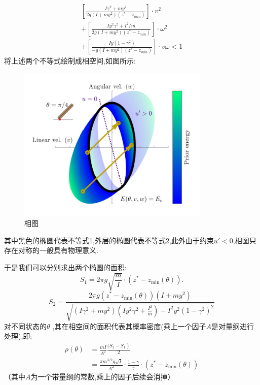 \documentclass[UTF8]{gapd}
\begin{document}
\begin{equation}
\begin{gathered}
\left[ \frac{I\gamma ^2+my^2}{2g\left( I+my^2 \right) \left( z^*-z_{min} \right)} \right] \cdot v^2
\\
+\left[ \frac{Iy^2\gamma ^2+I^2/m}{2g\left( I+my^2 \right) \left( z^*-z_{min} \right)} \right] \cdot \omega ^2
\\
+\left[ \frac{Iy\left( 1-\gamma ^2 \right)}{-g\left( I+my^2 \right) \left( z^*-z_{min} \right)} \right] \cdot v\omega <1
\end{gathered}
\end{equation}
将上述两个不等式绘制成相空间,如图所示:
\begin{figure}[h]%
	\centering
	\includegraphics[width=1\columnwidth]{images/相图}
	\caption{相图\cite{c3}}
	\label{fig:P2}%
\end{figure}
其中黑色的椭圆代表不等式1,外层的椭圆代表不等式2,此外由于约束$u'<0$,相图只存在对称的一般具有物理意义.

于是我们可以分别求出两个椭圆的面积:
\begin{equation}
S_{1}=2 \pi g \sqrt{\frac{m}{I}} \cdot\left(z^{*}-z_{\min }(\theta)\right) .
\end{equation}
\begin{equation}
S_{2}=\frac{2 \pi g\left(z^{*}-z_{\min }(\theta)\right)\left(I+m y^{2}\right)}{\sqrt{\left(I \gamma^{2}+m y^{2}\right)\left(I y^{2} \gamma^{2}+\frac{I^{2}}{m}\right)-I^{2} y^{2}\left(1-\gamma^{2}\right)^{2}}}
\end{equation}
对不同状态的$\theta$   ,其在相空间的面积代表其概率密度(乘上一个因子$A$是对量纲进行处理),即:
\begin{equation}
\begin{aligned}
\rho(\theta) &=\frac{m I}{A^{2}} \frac{\left.(S_{2}-S_{1}\right)}{2} \\
&=\frac{\pi m^{3 / 2} g \sqrt{I}}{
	A 
	^{2}} \cdot \frac{1-\gamma}{\gamma} \cdot\left(z^{*}-z_{\min }(\theta)\right)
\end{aligned}
\end{equation}
（其中$ A$为一个带量纲的常数,乘上的因子后续会消掉）
\end{document}
